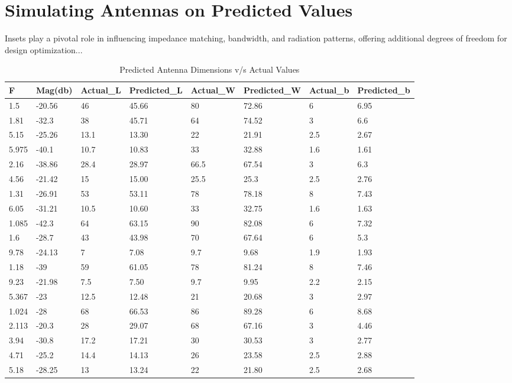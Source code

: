 \documentclass[a4paper,12pt]{report}
\begin{document}
\section{Simulating Antennas on Predicted Values}
\label{sec:exploring_other_techniques}
Insets play a pivotal role in influencing impedance matching, bandwidth, and radiation patterns, offering additional degrees of freedom for design optimization...


\begin{table}
   \caption{Predicted Antenna Dimensions v/s Actual Values}
    \small %
    \centering
    \begin{tabular}{|l|l|l|l|l|l|l|l|}
    \hline
    \textbf{F} & \textbf{Mag(db)} & \textbf{Actual\_L} & \textbf{Predicted\_L} & \textbf{Actual\_W} & \textbf{Predicted\_W} & \textbf{Actual\_b} & \textbf{Predicted\_b} \\ \hline
    1.5 & -20.56 & 46 & 45.66 & 80 & 72.86 & 6 & 6.95 \\ \hline
    1.81 & -32.3 & 38 & 45.71 & 64 & 74.52 & 3 & 6.6 \\ \hline
    5.15 & -25.26 & 13.1 & 13.30 & 22 & 21.91 & 2.5 & 2.67 \\ \hline
    5.975 & -40.1 & 10.7 & 10.83 & 33 & 32.88 & 1.6 & 1.61 \\ \hline
    2.16 & -38.86 & 28.4 & 28.97 & 66.5 & 67.54 & 3 & 6.3 \\ \hline
    4.56 & -21.42 & 15 & 15.00 & 25.5 & 25.3 & 2.5 & 2.76 \\ \hline
    1.31 & -26.91 & 53 & 53.11 & 78 & 78.18 & 8 & 7.43 \\ \hline
    6.05 & -31.21 & 10.5 & 10.60 & 33 & 32.75 & 1.6 & 1.63 \\ \hline
    1.085 & -42.3 & 64 & 63.15 & 90 & 82.08 & 6 & 7.32 \\ \hline
    1.6 & -28.7 & 43 & 43.98 & 70 & 67.64 & 6 & 5.3 \\ \hline
    9.78 & -24.13 & 7 & 7.08 & 9.7 & 9.68 & 1.9 & 1.93 \\ \hline
    1.18 & -39 & 59 & 61.05 & 78 & 81.24 & 8 & 7.46 \\ \hline
    9.23 & -21.98 & 7.5 & 7.50 & 9.7 & 9.95 & 2.2 & 2.15 \\ \hline
    5.367 & -23 & 12.5 & 12.48 & 21 & 20.68 & 3 & 2.97 \\ \hline
    1.024 & -28 & 68 & 66.53 & 86 & 89.28 & 6 & 8.68 \\ \hline
    2.113 & -20.3 & 28 & 29.07 & 68 & 67.16 & 3 & 4.46 \\ \hline
    3.94 & -30.8 & 17.2 & 17.21 & 30 & 30.53 & 3 & 2.77 \\ \hline
    4.71 & -25.2 & 14.4 & 14.13 & 26 & 23.58 & 2.5 & 2.88 \\ \hline
    5.18 & -28.25 & 13 & 13.24 & 22 & 21.80 & 2.5 & 2.68 \\ \hline
    \end{tabular}
\end{table}
\end{document}
